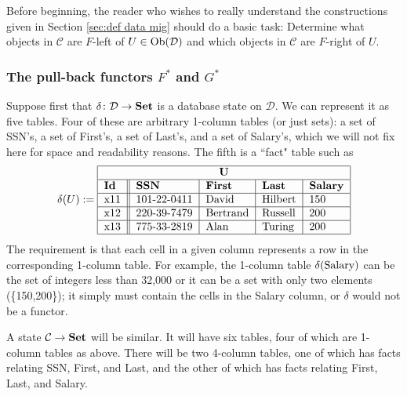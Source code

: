 \documentclass{amsart}
\def\tn{\textnormal}
\def\mc{\mathcal}
\def\Ob{\tn{Ob}}
\def\to{\rightarrow}
\def\taking{\colon}
\def\Set{{\bf Set}}
\def\mcC{\mc{C}}
\def\mcD{\mc{D}}
\theoremstyle{remark}
\theoremstyle{definition}
\begin{document}
Before beginning, the reader who wishes to really understand the constructions given in Section \ref{sec:def data mig} should do a basic task:  Determine what objects in $\mcC$ are $F$-left of $U\in\Ob(\mcD)$ and which objects in $\mcC$ are $F$-right of $U$.  

\subsubsection{The pull-back functors $F^*$ and $G^*$}\label{sssec:pull-back}

Suppose first that $\delta\taking\mcD\to\Set$ is a database state on $\mcD$.  We can represent it as five tables.  Four of these are arbitrary 1-column tables (or just sets): a set of SSN's, a set of First's, a set of Last's, and a set of Salary's, which we will not fix here for space and readability reasons.  The fifth is a ``fact" table such as \begin{align*}\delta(U):=\begin{tabular}{| l || l | l | l | l |}\hline\multicolumn{5}{| c |}{\bf U}\\\hline {\bf Id}&{\bf SSN}&{\bf First}&{\bf Last}&{\bf Salary}\\\hline x11&101-22-0411&David&Hilbert&150\\\hline x12&220-39-7479&Bertrand&Russell&200\\\hline x13&775-33-2819&Alan&Turing&200\\\hline\end{tabular}\end{align*}  The requirement is that each cell in a given column represents a row in the corresponding 1-column table.  For example, the 1-column table $\delta(\tn{Salary})$ can be the set of integers less than 32,000 or it can be a set with only two elements (\{150,200\}); it simply must contain the cells in the Salary column, or $\delta$ would not be a functor.

A state $\mcC\to\Set$ will be similar.  It will have six tables, four of which are 1-column tables as above.  There will be two 4-column tables, one of which has facts relating SSN, First, and Last, and the other of which has facts relating First, Last, and Salary.  
\end{document}
